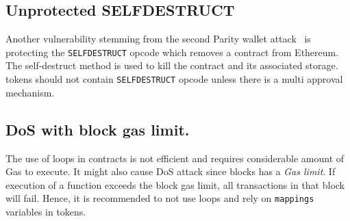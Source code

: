 \subsection{Unprotected SELFDESTRUCT}\label{subsec:slfd}
Another vulnerability stemming from the second Parity wallet attack~\cite{ParitySecondHack} is protecting the \texttt{SELFDESTRUCT} opcode which removes a contract from Ethereum. The self-destruct method is used to kill the contract and its associated storage. \erc tokens should not contain \texttt{SELFDESTRUCT} opcode unless there is a multi approval mechanism.

\subsection{DoS with block gas limit.}\label{subsec:glimit}
The use of loops in contracts is not efficient and requires considerable amount of Gas to execute. It might also cause DoS attack since blocks has a \textit{Gas limit}. If execution of a function exceeds the block gas limit, all transactions in that block will fail. Hence, it is recommended to not use loops and rely on \texttt{mappings} variables in \erc tokens. %
